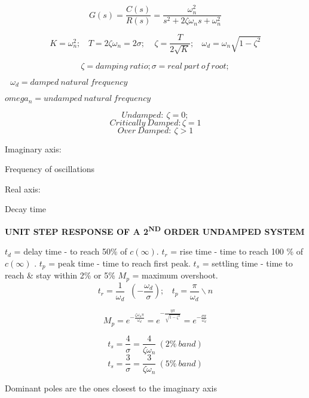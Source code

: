 \begin{multicols}{3}
\[G\left( s \right) = \frac{C(s)}{R(s)} = \frac{\omega_{n}^{2}}{s^{2} + 2\zeta\omega_{n}s + \omega_{n}^{2}}\]

\[K = \omega_{n}^{2};\ \ \ \ T = 2\zeta\omega_{n} = 2\sigma;\ \ \ \ \ \zeta = \frac{T}{2\sqrt{K}};\ \ \ \ \omega_{d} = \omega_{n}\sqrt{1 - \zeta^{2}}\]

\[\zeta = damping\ ratio; \sigma = real\ part\ of\ root;\]

\(\ \ \ \omega_{d} = damped\ natural\ frequency\)

\( omega_{n} = undamped\ natural\ frequency \)

\[ Undamped:\ \zeta = 0;\] 
\[ Critically\ Damped: \zeta = 1 \] 
\[ Over\ Damped:\ \zeta > 1\]

Imaginary axis:

Frequency of oscillations

Real axis:

Decay time

\textbf{UNIT STEP RESPONSE OF A 2\textsuperscript{ND} ORDER UNDAMPED
SYSTEM}

$ t_{d}$ = delay time - to reach 50\% of $c\left( \infty \right) $.
$ t_{r}$ = rise time - time to reach 100 \% of $c\left( \infty \right)$  . 
$ t_{p}$ = peak time - time to reach first peak. 
$ t_{s}$ = settling time - time to reach \& stay within 2\% or 5\% 
$ M_{p}$ = maximum overshoot. 
\[{t_{r} = \frac{1}{\omega_{d}}\operatorname{}\left( - \frac{\omega_{d}}{\sigma} \right);\ \ \ \ t_{p} = \frac{\pi}{\omega_{d}}\backslash n}\]

\[{M_{p} = e^{- \frac{\zeta\omega_{n}\pi}{\omega_{d}}} = e^{- \frac{\eta \pi}{\sqrt{1 - \zeta^{2}}}} = e^{- \frac{\sigma \pi}{\omega_{d}}}}\]

\[t_{s} = \frac{4}{\sigma} = \frac{4}{\zeta\omega_{n}}\ \left( 2\%\ band \right)\]
\[t_{s} = \frac{3}{\sigma} = \frac{3}{\zeta\omega_{n}}\ \left( 5\%\ band \right)\]

Dominant poles are the ones closest to the imaginary axis


\end{multicols}
